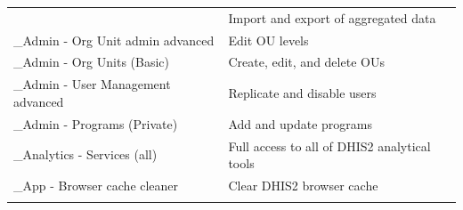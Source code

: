 \documentclass[]{book}
\begin{document}
\begin{longtable}[]{@{}ll@{}}
\begin{minipage}[t]{0.33\columnwidth}
\end{minipage} & \begin{minipage}[t]{0.61\columnwidth}\raggedright
Import and export of aggregated data\strut
\end{minipage}\tabularnewline
\begin{minipage}[t]{0.33\columnwidth}\raggedright
\_Admin - Org Unit admin advanced\strut
\end{minipage} & \begin{minipage}[t]{0.61\columnwidth}\raggedright
Edit OU levels\strut
\end{minipage}\tabularnewline
\begin{minipage}[t]{0.33\columnwidth}\raggedright
\_Admin - Org Units (Basic)\strut
\end{minipage} & \begin{minipage}[t]{0.61\columnwidth}\raggedright
Create, edit, and delete OUs\strut
\end{minipage}\tabularnewline
\begin{minipage}[t]{0.33\columnwidth}\raggedright
\_Admin - User Management advanced\strut
\end{minipage} & \begin{minipage}[t]{0.61\columnwidth}\raggedright
Replicate and disable users\strut
\end{minipage}\tabularnewline
\begin{minipage}[t]{0.33\columnwidth}\raggedright
\_Admin - Programs (Private)\strut
\end{minipage} & \begin{minipage}[t]{0.61\columnwidth}\raggedright
Add and update programs\strut
\end{minipage}\tabularnewline
\begin{minipage}[t]{0.33\columnwidth}\raggedright
\_Analytics - Services (all)\strut
\end{minipage} & \begin{minipage}[t]{0.61\columnwidth}\raggedright
Full access to all of DHIS2 analytical tools\strut
\end{minipage}\tabularnewline
\begin{minipage}[t]{0.33\columnwidth}\raggedright
\_App - Browser cache cleaner\strut
\end{minipage} & \begin{minipage}[t]{0.61\columnwidth}\raggedright
Clear DHIS2 browser cache\strut
\end{minipage}\tabularnewline
\begin{minipage}[t]{0.33\columnwidth}\raggedright

\end{minipage}
\end{longtable}
\end{document}

